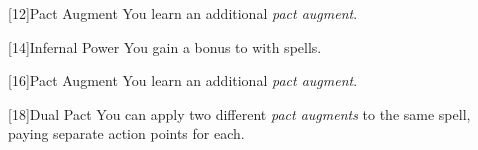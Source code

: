         [12]{Pact Augment} You learn an additional \textit{pact augment}.

        [14]{Infernal Power} You gain a  bonus to  with spells.

        [16]{Pact Augment} You learn an additional \textit{pact augment}.

        [18]{Dual Pact} You can apply two different \textit{pact augments} to the same spell, paying separate action points for each.
